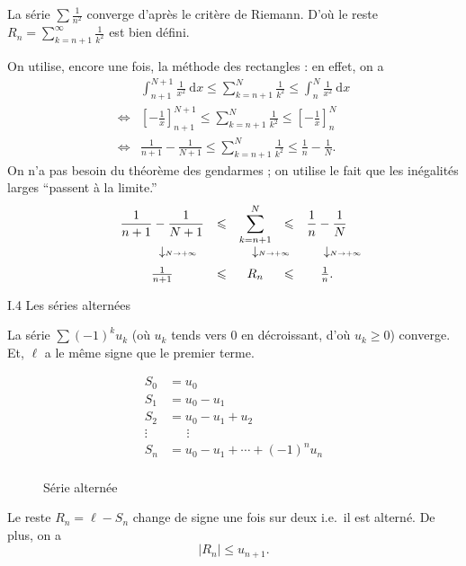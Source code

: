 \begin{exo}
	La série $\sum \frac{1}{n^2}$\/ converge d'après le critère de {\sc Riemann}.
	D'où le reste $R_n = \sum_{k=n+1}^{\infty} \frac{1}{k^2}$\/ est bien défini.
	
	On utilise, encore une fois, la méthode des rectangles : en effet, on a
	\begin{align*}
		&\int_{n+1}^{N+1} \frac{1}{x^2}~\mathrm{d}x \le \sum_{k=n+1}^{N} \frac{1}{k^2} \le \int_{n}^{N} \frac{1}{x^2}~\mathrm{d}x\\
		\iff& \left[ -\frac{1}{x} \right]^{N+1}_{n+1} \le \sum_{k=n+1}^N \frac{1}{k^2} \le \left[ -\frac{1}{x} \right]_n^N\\
		\iff& \frac{1}{n+1} - \frac{1}{N+1} \le \sum_{k=n+1}^N \frac{1}{k^2} \le \frac{1}{n} - \frac{1}{N}.
	\end{align*}
	On n'a pas besoin du théorème des gendarmes ; on utilise le fait que les inégalités larges ``passent à la limite.''
	\[
		\begin{array}{ccccc}
			\ds\frac{1}{n+1} - \frac{1}{N+1} & \le & \ds\sum_{k=n+1}^N & \le & \ds\frac{1}{n} - \frac{1}{N}\\[2mm]
			{\ds \downarrow}\mathrlap{\scriptscriptstyle N\to +\infty} && {\ds \downarrow}\mathrlap{\scriptscriptstyle N\to +\infty} && {\ds \downarrow}\mathrlap{\scriptscriptstyle N\to +\infty}\\[2mm]
			\frac{1}{n+1} & \le & R_n &\le& \frac{1}{n}.
		\end{array}
	\]
\end{exo}

\bigskip

\begin{center}
	\large\sc I.4 \quad Les séries alternées
\end{center}

\bigskip

\begin{thm}
	La série $\sum (-1)^k u_k$\/ (où $u_k$\/ tends vers $0$\/ {\color{red}en décroissant}, d'où $u_k \ge 0$) converge. Et, $\ell$\/ a le même signe que le premier terme.

	\begin{align*}
		S_0&= u_0\\
		S_1&= u_0 - u_1 \\
		S_2&= u_0 - u_1 + u_2 \\
		\vdots\:\:&\:\:\quad\vdots\\
		S_n&= u_0 - u_1 + \cdots + (-1)^nu_n \\
	\end{align*}

	\begin{figure}[H]
		\centering
		\caption{Série alternée}
	\end{figure}
	Le reste $R_n = \ell - S_n$ change de signe une fois sur deux i.e.\ il est alterné. De plus, on a \[
		|R_n| \le u_{n+1}
	.\]
\end{thm}


